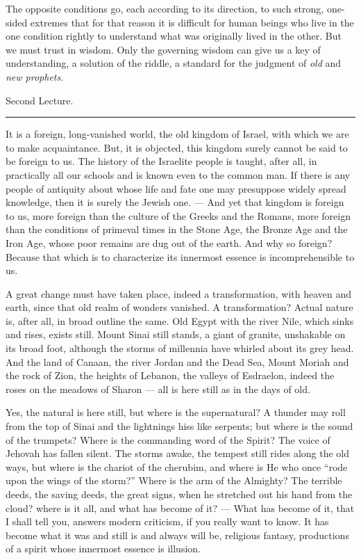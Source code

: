 \documentclass[12pt,a4paper,openany]{book}
\newcommand{\opage}[1]{\marginnote{\footnotesize\textit{[#1]}}}
\newcommand{\lecture}[1]{\clearpage\begin{center}{\large #1}\\[0.4em]\rule{3em}{0.4pt}\end{center}\medskip\noindent}
\begin{document}
The opposite conditions go, each according to its direction,
to such strong, one-sided extremes that for that
reason it is difficult for human beings who live in the one
condition rightly to understand what was originally lived
in the other. But we must trust in wisdom.
Only the governing wisdom can give us a key of understanding,
a solution of the riddle, a standard for the judgment
of \emph{old} and \emph{new prophets}.

\setcounter{footnote}{0}%
\lecture{Second Lecture.}\opage{20}It is a foreign, long-vanished world, the old kingdom
of Israel, with which we are to make acquaintance. But,
it is objected, this kingdom surely cannot be said to be
foreign to us. The history of the Israelite people is taught, after all,
in practically all our schools and is known even to the
common man. If there is any people of antiquity about whose
life and fate one may presuppose widely spread
knowledge, then it is surely the Jewish one. --- And yet
that kingdom is foreign to us, more foreign than the culture of the Greeks
and the Romans, more foreign than the conditions of primeval times
in the Stone Age, the Bronze Age and the Iron Age,
whose poor remains are dug out of the earth. And why
so foreign? Because that which is to characterize its
innermost essence is incomprehensible to us.

A great change must have taken place, indeed a
transformation, with heaven and earth, since that old
realm of wonders vanished. A transformation? Actual
nature is, after all, in broad outline the same. Old
Egypt with the river Nile, which sinks and rises, exists
still. Mount Sinai still stands, a giant of granite,
unshakable on its broad foot, although the storms of millennia
have whirled about its grey head. And the land of Canaan,
the river Jordan and the Dead Sea, Mount Moriah and
\setcounter{footnote}{0}%
\opage{21}the rock of Zion, the heights of Lebanon, the valleys of Esdraelon, indeed the roses
on the meadows of Sharon --- all is here still as in the days of old.

Yes, the natural is here still, but where is the
supernatural? A thunder may roll from the top of Sinai and
the lightnings hiss like serpents; but where is the sound
of the trumpets? Where is the commanding word of the Spirit? The voice of Jehovah
has fallen silent. The storms awake, the tempest still rides
along the old ways, but where is the chariot of the cherubim, and
where is He who once ``rode upon the wings of the storm?''
Where is the arm of the Almighty? The terrible deeds,
the saving deeds, the great signs, when
he stretched out his hand from the cloud? where is it all,
and what has become of it? --- What has
become of it, that I shall tell you, answers modern
criticism, if you really want to know. It has become
what it was and still is and always will be, religious
fantasy, productions of a spirit whose innermost
essence is illusion.
\end{document}
